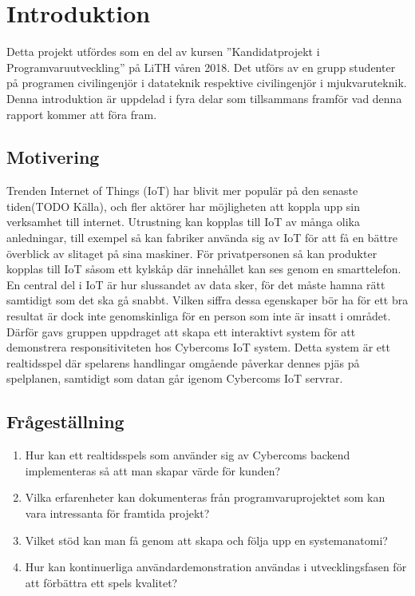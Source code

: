 \chapter{Introduktion}
\label{cha:introduction}

Detta projekt utfördes som en del av kursen ''Kandidatprojekt i Programvaruutveckling'' på LiTH våren 2018. Det utförs av en grupp studenter på programen civilingenjör i datateknik respektive civilingenjör i mjukvaruteknik.
Denna introduktion är uppdelad i fyra delar som tillsammans framför vad denna rapport kommer att föra fram.

\section{Motivering}
\label{sec:motivation}
Trenden Internet of Things (IoT) har blivit mer populär på den senaste tiden(TODO Källa), och fler aktörer har möjligheten att koppla upp sin verksamhet till internet. Utrustning kan kopplas till IoT av många olika anledningar, till exempel så kan fabriker använda sig av IoT för att få en bättre överblick av slitaget på sina maskiner. För privatpersonen så kan produkter kopplas till IoT såsom ett kylskåp där innehållet kan ses genom en smarttelefon. En central del i IoT är hur slussandet av data sker, för det måste hamna rätt samtidigt som det ska gå snabbt. Vilken siffra dessa egenskaper bör ha för ett bra resultat är dock inte genomskinliga för en person som inte är insatt i området. Därför gavs gruppen uppdraget att skapa ett interaktivt system för att demonstrera responsitiviteten hos Cybercoms IoT system. Detta system är ett realtidsspel där spelarens handlingar omgående påverkar dennes pjäs på spelplanen, samtidigt som datan går igenom Cybercoms IoT servrar.


\section{Frågeställning}

\begin{enumerate}
	\item \label{fs:fs_1} Hur kan ett realtidsspels som använder sig av Cybercoms backend implementeras så att man skapar värde för kunden?
	\item \label{fs:fs_2} Vilka erfarenheter kan dokumenteras från programvaruprojektet som kan vara intressanta för framtida projekt?
	\item \label{fs:fs_3} Vilket stöd kan man få genom att skapa och följa upp en systemanatomi?
	\item \label{fs:fs_4} Hur kan kontinuerliga användardemonstration användas i utvecklingsfasen för att förbättra ett spels kvalitet?

\end{enumerate}

